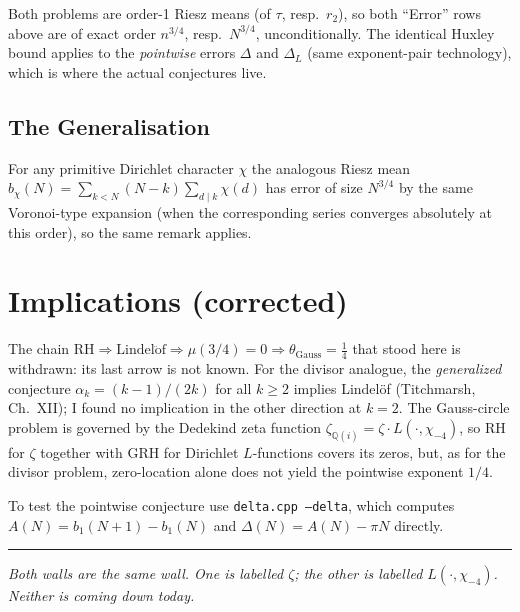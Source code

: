 \documentclass[12pt]{article}
\theoremstyle{definition}
\begin{document}
Both problems are order-1 Riesz means (of $\tau$, resp.\ $r_2$), so both ``Error'' rows
above are of exact order $n^{3/4}$, resp.\ $N^{3/4}$, unconditionally.  The identical Huxley bound applies to
the \emph{pointwise} errors $\Delta$ and $\Delta_L$ (same exponent-pair technology), which
is where the actual conjectures live.

\subsection{The Generalisation}

For any primitive Dirichlet character $\chi$ the analogous Riesz mean
$b_\chi(N)=\sum_{k<N}(N-k)\sum_{d\mid k}\chi(d)$ has error of size $N^{3/4}$ by the same
Voronoi-type expansion (when the corresponding series converges absolutely at this order), so the
same remark applies.

\section{Implications (corrected)}

The chain $\mathrm{RH}\Rightarrow\mathrm{Lindel\ddot of}\Rightarrow\mu(3/4)=0\Rightarrow
\theta_{\mathrm{Gauss}}=\tfrac14$ that stood here is withdrawn: its last arrow is not known.
For the divisor analogue, the \emph{generalized} conjecture $\alpha_k=(k-1)/(2k)$ for all
$k\ge2$ implies Lindel\"of (Titchmarsh, Ch.~XII); I found no implication in the other
direction at $k=2$.  The Gauss-circle problem is governed by the Dedekind zeta function
$\zeta_{\mathbb Q(i)}=\zeta\cdot L(\cdot,\chi_{-4})$, so RH for $\zeta$ together with GRH for
Dirichlet $L$-functions covers its zeros, but, as for the divisor problem, zero-location
alone does not yield the pointwise exponent $1/4$.

To test the pointwise conjecture use \texttt{delta.cpp --delta}, which computes
$A(N)=b_1(N+1)-b_1(N)$ and $\Delta(N)=A(N)-\pi N$ directly.

\bigskip
\hrule
\bigskip

\noindent\textit{%
Both walls are the same wall.
One is labelled $\zeta$; the other is labelled $L(\cdot,\chi_{-4})$.
Neither is coming down today.
}
\end{document}
